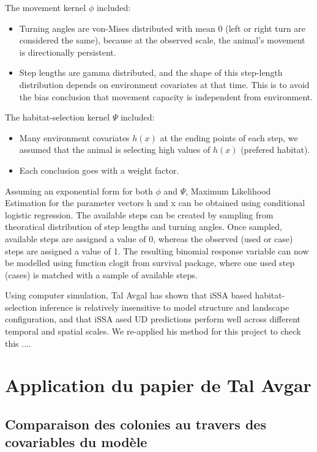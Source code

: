 \documentclass{article}
\begin{document}
The movement kernel $\phi$ included:
\begin{itemize}
  \item Turning angles are von-Mises distributed with mean 0 (left or right turn are considered the same), because at the observed scale, the animal’s movement is directionally persistent.
  \item Step lengths are gamma distributed, and the shape of this step-length distribution depends on environment covariates at that time. This is to avoid the bias conclusion that movement capacity is independent from environment.
\end{itemize}

The habitat-selection kernel $\Psi$ included:
\begin{itemize}
  \item Many environment covariates $h(x)$ at the ending points of each step, we assumed that the animal is selecting high values of $h(x)$ (prefered habitat).
  \item Each conclusion goes with a weight factor.
\end{itemize}
    
Assuming an exponential form for both $\phi$ and $\Psi$, Maximum Likelihood Estimation for the parameter vectors h and x can be obtained using conditional logistic regression. The available steps can be created by sampling from theoratical distribution of step lengths and turning angles. Once sampled, available steps are assigned a value of
0, whereas the observed (used or case) steps are assigned a value of 1. The resulting binomial response variable can now be modelled using function clogit from survival package, where one used step (cases) is matched with a sample of available steps.

Using computer simulation, Tal Avgal has shown that iSSA based habitat-selection inference is relatively insensitive to model structure and landscape configuration, and that iSSA ased UD predictions perform well across different temporal and spatial scales. We re-applied his method for this project to check this ....

\section{Application du papier de Tal Avgar}

\subsection{Comparaison des colonies au travers des covariables du modèle}
\end{document}
